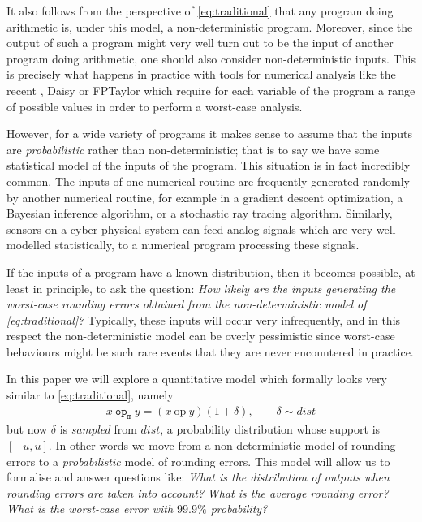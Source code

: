\documentclass[10pt,conference]{IEEEtran}
\newcommand{\mop}{~\mathtt{op_m}~}
\newcommand{\iop}{~\mathrm{op}~}
\begin{document}
It also follows from the perspective of \cref{eq:traditional} that any program doing arithmetic is, under this model, a non-deterministic program. Moreover, since the output of such a program might very well turn out to be the input of another program doing arithmetic, one should also consider non-deterministic inputs. This is precisely what happens in practice with tools for numerical analysis like the recent \cite{magron2017certified}, Daisy \cite{darulova2018daisy} or FPTaylor \cite{solovyev2018rigorous} which require for each variable of the program a range of possible values in order to perform a worst-case analysis.

However, for a wide variety of programs  it makes sense to assume that the inputs are \emph{probabilistic} rather than non-deterministic; that is to say we have some statistical model of the inputs of the program. This situation is in fact incredibly common. The inputs of one numerical routine are frequently generated randomly by another numerical routine, for example in a gradient descent optimization, a Bayesian inference algorithm, or a stochastic ray tracing algorithm. Similarly, sensors on a cyber-physical system can feed analog signals which are very well modelled statistically, to a numerical program processing these signals. 

If the inputs of a program have a known distribution, then it becomes possible, at least in principle, to ask the question: \textit{How likely are the inputs generating the worst-case rounding errors obtained from the non-deterministic model of \cref{eq:traditional}?} Typically, these inputs will occur very infrequently, and in this respect the non-deterministic model can be overly pessimistic since worst-case behaviours might be such rare events that they are never encountered in practice. 

In this paper we will explore a quantitative model which formally looks very similar to \cref{eq:traditional}, namely
\begin{align}
x\mop y=(x\iop y)(1+\delta), \qquad\delta\sim dist \label{eq:probabilistic}
\end{align}
but now $\delta$ is \emph{sampled} from $dist$, a probability distribution whose support is $\left[-u,u\right]$. In other words we move from a non-deterministic model of rounding errors to a \emph{probabilistic} model of rounding errors. This model will allow us to formalise and answer questions like: \textit{What is the distribution of outputs when rounding errors are taken into account?} \textit{What is the average rounding error?} \textit{What is the worst-case error with $99.9\%$ probability?}
\end{document}
